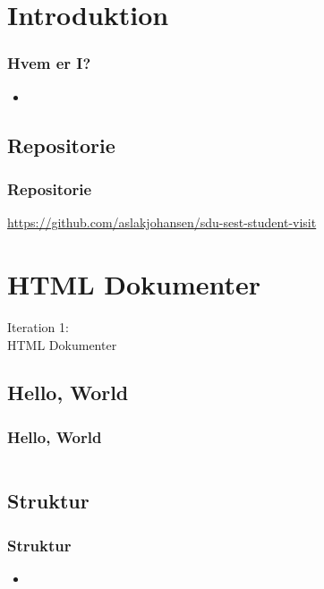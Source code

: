 \section{Introduktion}
\begin{frame}
    \frametitle{Hvem er I?}
    \begin{itemize}
      \item 
    \end{itemize}
\end{frame}

\subsection{Repositorie}
\begin{frame}
    \frametitle{Repositorie}
    \begin{center}
      \url{https://github.com/aslakjohansen/sdu-sest-student-visit}
    \end{center}
\end{frame}

\section{HTML Dokumenter}
\begin{frame}
    \vspace{25mm}
    \begin{center}
        \Huge{Iteration 1:\\HTML Dokumenter}
    \end{center}
\end{frame}

\subsection{Hello, World}
\begin{frame}
    \frametitle{Hello, World}
    \inputminted{html}{../src/frontend/iteration1_html_hello/index.html}
\end{frame}

\subsection{Struktur}
\begin{frame}
    \frametitle{Struktur}
    \begin{itemize}
      \item 
    \end{itemize}
\end{frame}

